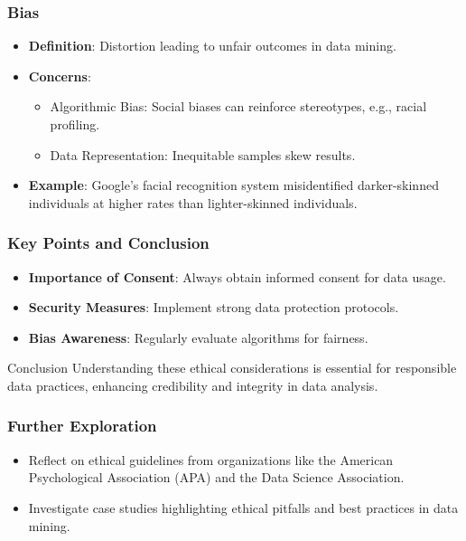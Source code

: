 \documentclass{beamer}
\begin{document}
\begin{frame}[fragile]
    \frametitle{Bias}
    \begin{itemize}
        \item \textbf{Definition}: Distortion leading to unfair outcomes in data mining.
        \item \textbf{Concerns}:
        \begin{itemize}
            \item Algorithmic Bias: Social biases can reinforce stereotypes, e.g., racial profiling.
            \item Data Representation: Inequitable samples skew results.
        \end{itemize}
        \item \textbf{Example}: Google’s facial recognition system misidentified darker-skinned individuals at higher rates than lighter-skinned individuals.
    \end{itemize}
\end{frame}

\begin{frame}[fragile]
    \frametitle{Key Points and Conclusion}
    \begin{itemize}
        \item \textbf{Importance of Consent}: Always obtain informed consent for data usage.
        \item \textbf{Security Measures}: Implement strong data protection protocols.
        \item \textbf{Bias Awareness}: Regularly evaluate algorithms for fairness.
    \end{itemize}
    \begin{block}{Conclusion}
        Understanding these ethical considerations is essential for responsible data practices, enhancing credibility and integrity in data analysis.
    \end{block}
\end{frame}

\begin{frame}[fragile]
    \frametitle{Further Exploration}
    \begin{itemize}
        \item Reflect on ethical guidelines from organizations like the American Psychological Association (APA) and the Data Science Association.
        \item Investigate case studies highlighting ethical pitfalls and best practices in data mining.
    \end{itemize}
\end{frame}
\end{document}
